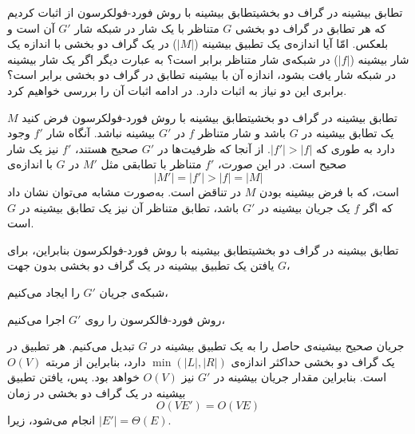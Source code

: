 \begin{itemframe-s}{تطابق بیشینه در گراف دو بخشی}{تطابق بیشینه با روش فورد-فولکرسون}
\itm
از اثبات کردیم که هر تطابق در گراف دو بخشی $G$ متناظر با یک شار در شبکه شار $G'$ آن است و بلعکس.
\itm
امّا آیا اندازه‌ی یک تطبیق بیشینه ($|M|$) در یک گراف دو بخشی با اندازه یک شار بیشینه ($|f|$) در شبکه‌ی شار متناظر برابر است؟ به عبارت دیگر اگر یک شار بیشینه در شبکه شار یافت بشود، اندازه آن با بیشینه تطابق در گراف دو بخشی برابر است؟
\itm
برابری این دو نیاز به اثبات دارد. در ادامه اثبات آن را بررسی خواهیم کرد.
\end{itemframe-s}
\begin{itemframe-s}{تطابق بیشینه در گراف دو بخشی}{تطابق بیشینه با روش فورد-فولکرسون}
\itm
 فرض کنید $M$ یک تطابق بیشینه در $G$ باشد و شار متناظر $f$ در $G'$ بیشینه نباشد. آنگاه شار $f'$ وجود دارد به طوری که $|f'| > |f|$.
\itm
از آنجا که ظرفیت‌ها در $G'$ صحیح هستند، $f'$ نیز یک شار صحیح است.
در این صورت، $f'$ متناظر با تطابقی مثل $M'$ در $G$ با اندازه‌ی
$$|M'| = |f'| > |f| = |M|$$
است، که با فرض بیشینه بودن $M$ در تناقض است.
\itm
به‌صورت مشابه می‌توان نشان داد که اگر $f$ یک جریان بیشینه در $G'$ باشد، تطابق متناظر آن نیز یک تطابق بیشینه در $G$ است.
\end{itemframe-s}

\begin{itemframe-s}{تطابق بیشینه در گراف دو بخشی}{تطابق بیشینه با روش فورد-فولکرسون}
\itm
بنابراین، برای یافتن یک تطبیق بیشینه در یک گراف دو بخشی بدون جهت $G$،
\item[1]
 شبکه‌ی جریان $G'$ را ایجاد می‌کنیم،
\item[2]
روش فورد-فالکرسون را روی $G'$ اجرا می‌کنیم،
\item[3]
 جریان صحیح بیشینه‌ی حاصل را به یک تطبیق بیشینه در $G$ تبدیل می‌کنیم.
\itm
هر تطبیق در یک گراف دو بخشی حداکثر اندازه‌ی
 $\min({|L|, |R|}) $
دارد، بنابراین از مربته
$O(V)$
است.
بنابراین مقدار جریان بیشینه در $G'$ نیز $O(V)$ خواهد بود. پس، یافتن تطبیق بیشینه در یک گراف دو بخشی در زمان
$$O(VE') = O(VE)$$
انجام می‌شود، زیرا
 $|E'| = \Theta(E)$.
\end{itemframe-s}